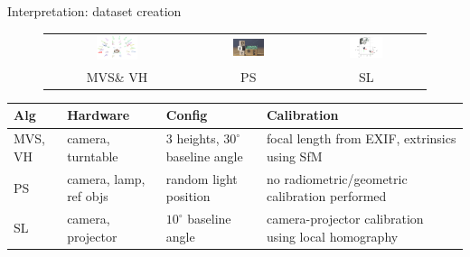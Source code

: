 \documentclass[10pt]{beamer}
\begin{document}
\begin{frame}{Interpretation: dataset creation}

\begin{figure}
\centering
\begin{tabular}{ccc}
\includegraphics[width=0.3\textwidth]{images/mvs_calib.PNG} &
\includegraphics[width=0.3\textwidth]{images/diy_repair_recon.jpg} &
\includegraphics[width=0.3\textwidth]{images/sl_calib.png}\\
MVS\& VH & PS & SL \\
\end{tabular}
\end{figure}

\begin{table}
  \begin{tabular}{p{1cm}p{2cm}p{2.5cm}p{4cm}}
  Alg & Hardware & Config & Calibration \\
  \midrule
  MVS, VH & camera, turntable  & 3 heights, $30^\circ$ baseline angle & focal length from EXIF, extrinsics using SfM \\
  PS & camera, lamp, ref objs & random light position & no radiometric/geometric calibration performed \\
  SL & camera, projector & $10^\circ$ baseline angle & camera-projector calibration using local homography\\
  \end{tabular}
\end{table}

\end{frame}
\end{document}
